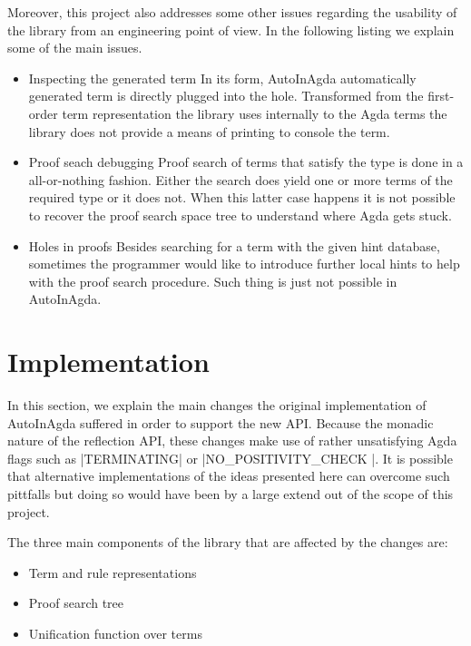 \documentclass[12pt]{article}
\begin{document}
Moreover, this project also addresses some other issues regarding the usability
of the library from an engineering point of view. In the following listing we
explain some of the main issues.

\begin{itemize}
    \label {listing:usability}
    \item Inspecting the generated term
      In its form, AutoInAgda automatically generated term is directly plugged
      into the hole. Transformed from the first-order term representation the
      library uses internally to the Agda terms the library does not provide a
      means of printing to console the term.
    \item Proof seach debugging
      Proof search of terms that satisfy the type is done in a all-or-nothing
      fashion. Either the search does yield one or more terms of the required
      type or it does not. When this latter case happens it is not possible to
      recover the proof search space tree to understand where Agda gets stuck.
    \item Holes in proofs
      Besides searching for a term with the given hint database, sometimes the
      programmer would like to introduce further local hints to help with the
      proof search procedure. Such thing is just not possible in AutoInAgda.
\end{itemize}

\section{Implementation}

In this section, we explain the main changes the original implementation of
AutoInAgda suffered in order to support the new API. Because the monadic nature
of the reflection API, these changes make use of rather unsatisfying Agda flags
such as |TERMINATING| or |NO_POSITIVITY_CHECK |. It is possible that
alternative implementations of the ideas presented here can overcome such
pittfalls but doing so would have been by a large extend out of the scope of
this project.

The three main components of the library that are affected by the changes are:

\begin{itemize}
    \item Term and rule representations
    \item Proof search tree
    \item Unification function over terms
\end{itemize}
\end{document}
